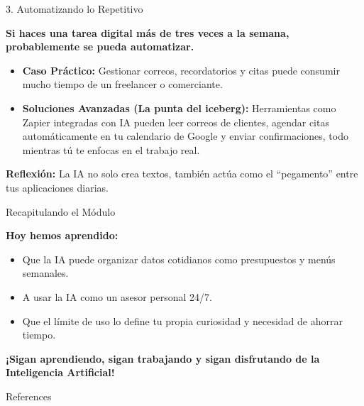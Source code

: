 \documentclass[aspectratio=169]{beamer}
\begin{document}
\begin{frame}[fragile]{3. Automatizando lo Repetitivo}


\textbf{Si haces una tarea digital más de tres veces a la semana, probablemente se pueda automatizar.}

\begin{itemize}
  \item \textbf{Caso Práctico:} Gestionar correos, recordatorios y citas puede consumir mucho tiempo de un freelancer o comerciante.
  \item \textbf{Soluciones Avanzadas (La punta del iceberg):} Herramientas como Zapier integradas con IA pueden leer correos de clientes, agendar citas automáticamente en tu calendario de Google y enviar confirmaciones, todo mientras tú te enfocas en el trabajo real.
\end{itemize}
\textbf{Reflexión:} La IA no solo crea textos, también actúa como el ``pegamento'' entre tus aplicaciones diarias.

\end{frame}



\begin{frame}[fragile]{Recapitulando el Módulo}


\textbf{Hoy hemos aprendido:}
\begin{itemize}
  \item Que la IA puede organizar datos cotidianos como presupuestos y menús semanales.
  \item A usar la IA como un asesor personal 24/7.
  \item Que el límite de uso lo define tu propia curiosidad y necesidad de ahorrar tiempo.
\end{itemize}
\textbf{¡Sigan aprendiendo, sigan trabajando y sigan disfrutando de la Inteligencia Artificial!}
\end{frame}




\begin{frame}[allowframebreaks]{References}
  
  
\end{frame}
\end{document}
